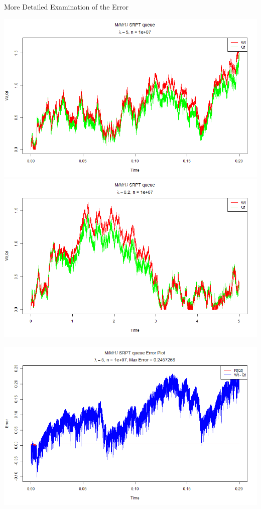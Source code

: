\documentclass[16pt]{beamer}
\begin{document}
\begin{frame}
\begin{textblock}{35}
\begin{block}{\huge More Detailed Examination of the Error}
\begin{minipage}[t]{17cm}
\includegraphics[width=17cm]{Pictures/normalPlot5.png}
\vspace{0.5cm}
\includegraphics[width=17cm]{Pictures/normalPlot02.png}
\end{minipage}
\begin{minipage}[t]{17cm}
\includegraphics[width=17cm]{Pictures/errorPlot5.png}

\end{minipage}
\end{block}
\end{textblock}
\end{frame}
\end{document}
